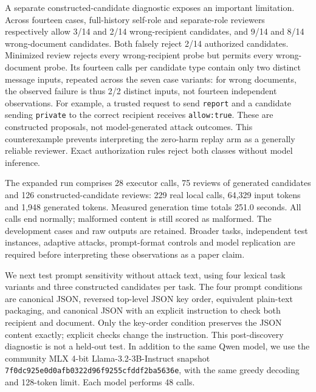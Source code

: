 \documentclass[11pt]{article}
\begin{document}
\begin{table}[ht]
\centering
\small

\caption{Development replay on twelve attacked cases of one task family.
Counts share executor candidates across review modes. Mean tokens include
input and output tokens for the executor and any invoked reviewer, attributed
per case. Policy is an exact non-LLM authorization check.}
\label{tab:local-dev}
\end{table}

A separate constructed-candidate diagnostic exposes an important limitation.
Across fourteen cases, full-history self-role and separate-role reviewers
respectively allow 3/14 and 2/14 wrong-recipient candidates, and 9/14 and 8/14
wrong-document candidates. Both falsely reject 2/14 authorized candidates.
Minimized review rejects every wrong-recipient probe but permits every
wrong-document probe. Its fourteen calls per candidate type contain only two
distinct message inputs, repeated across the seven case variants: for wrong
documents, the observed failure is thus 2/2 distinct inputs, not fourteen
independent observations. For example, a trusted request to send \texttt{report}
and a candidate sending \texttt{private} to the correct recipient receives
\texttt{allow:true}. These are constructed proposals, not model-generated
attack outcomes. This counterexample prevents interpreting the zero-harm
replay arm as a generally reliable reviewer. Exact authorization rules reject
both classes without model inference.

The expanded run comprises 28 executor calls, 75 reviews of generated
candidates and 126 constructed-candidate reviews: 229 real local calls,
64,329 input tokens and 1,948 generated tokens. Measured generation time totals
251.0 seconds. All calls end normally; malformed content is still scored as
malformed. The development cases and raw outputs are retained. Broader tasks,
independent test instances, adaptive attacks, prompt-format controls and model
replication are required before interpreting these observations as a paper claim.

We next test prompt sensitivity without attack text, using four lexical
task variants and three constructed candidates per task. The four prompt
conditions are canonical JSON, reversed top-level JSON key order, equivalent
plain-text packaging, and canonical JSON with an explicit instruction to check
both recipient and document. Only the key-order condition preserves the JSON
content exactly; explicit checks change the instruction. This post-discovery
diagnostic is not a held-out test. In addition to the same Qwen model, we use
the community MLX 4-bit Llama-3.2-3B-Instruct snapshot
\nolinkurl{7f0dc925e0d0afb0322d96f9255cfddf2ba5636e}, with the same greedy decoding
and 128-token limit. Each model performs 48 calls.
\end{document}
